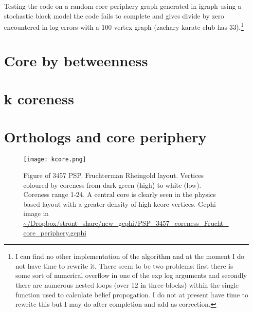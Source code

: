 Testing the code on a random core periphery graph generated in igraph using a stochastic block model the code fails to complete and gives divide by zero encountered in log errors with a 100 vertex graph (zachary karate club has 33).\footnote{I can find no other implementation of the algorithm and at the moment I do not have time to rewrite it. There seem to be two problems: first there is some sort of numerical overflow in one of the exp log arguments and secondly there are numerous nested loops (over 12 in three blocks) within the single function used to calculate belief propogation. I do not at present have time to rewrite this but I may do after completion and add as correction.}


\section{Core by betweenness}

\section{k coreness}

\section{Orthologs and core periphery}



\begin{figure}[h]
\texttt{[image: kcore.png]}
\caption{Figure of 3457 PSP. Fruchterman Rheingold layout. Vertices coloured by coreness from dark green (high) to white (low). Coreness range 1-24. A central core is clearly seen in the physics based layout with a greater density of high kcore vertices. Gephi image in \url{~/Dropbox/stront_share/new_gephi/PSP_3457_coreness_Frucht_core_periphery.gephi
}}
\label{Fig:kcoreness}
\end{figure}



